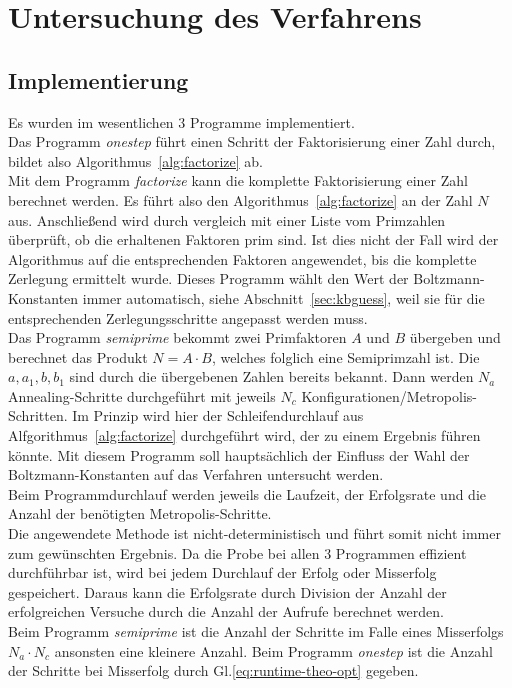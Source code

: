 \chapter{Untersuchung des Verfahrens}\label{ch:results}

\section{Implementierung}
Es wurden im wesentlichen $3$ Programme implementiert.  \\
Das Programm \textit{onestep} führt einen Schritt der Faktorisierung einer Zahl durch, bildet also Algorithmus~\ref{alg:factorize} ab. \\
Mit dem Programm \textit{factorize} kann die komplette Faktorisierung einer Zahl berechnet werden. Es führt also den Algorithmus~\ref{alg:factorize} an der Zahl $N$ aus. Anschließend wird durch vergleich mit einer Liste vom Primzahlen überprüft, ob die erhaltenen Faktoren prim sind. Ist dies nicht der Fall wird der Algorithmus auf die entsprechenden Faktoren angewendet, bis die komplette Zerlegung ermittelt wurde. Dieses Programm wählt den Wert der Boltzmann-Konstanten immer automatisch, siehe Abschnitt~\ref{sec:kbguess}, weil sie für die entsprechenden Zerlegungsschritte angepasst werden muss.\\
Das Programm \textit{semiprime} bekommt zwei Primfaktoren $A$ und $B$ übergeben und berechnet das Produkt $N=A\cdot B$, welches folglich eine Semiprimzahl ist. Die $a, a_1, b, b_1$ sind durch die übergebenen Zahlen bereits bekannt. Dann werden $N_a$ Annealing-Schritte durchgeführt mit jeweils $N_c$ Konfigurationen/Metropolis-Schritten. Im Prinzip  wird hier der Schleifendurchlauf aus Alfgorithmus~\ref{alg:factorize} durchgeführt wird, der zu einem Ergebnis führen könnte. Mit diesem Programm soll hauptsächlich der Einfluss der Wahl der Boltzmann-Konstanten auf das Verfahren untersucht werden. \\
Beim Programmdurchlauf werden jeweils die Laufzeit, der Erfolgsrate und die Anzahl der benötigten Metropolis-Schritte. \\
Die angewendete Methode ist nicht-deterministisch und führt somit nicht immer zum gewünschten Ergebnis. Da die Probe bei allen $3$ Programmen effizient durchführbar ist, wird bei jedem Durchlauf der Erfolg oder Misserfolg gespeichert. Daraus kann die Erfolgsrate durch Division der Anzahl der erfolgreichen Versuche durch die Anzahl der Aufrufe berechnet werden. \\
Beim Programm \textit{semiprime} ist die Anzahl der Schritte im Falle eines Misserfolgs $N_a\cdot N_c$ ansonsten eine kleinere Anzahl. Beim Programm \textit{onestep} ist die Anzahl der Schritte bei Misserfolg durch Gl.\eqref{eq:runtime-theo-opt} gegeben.\\
